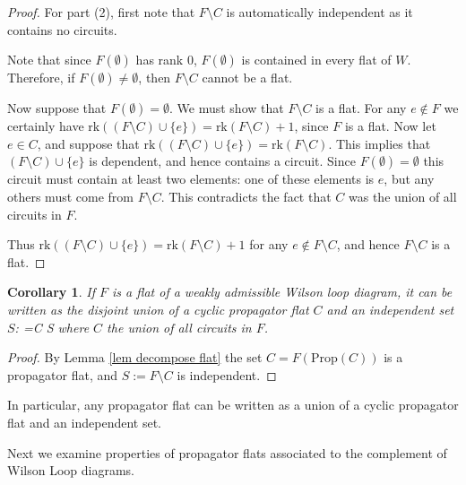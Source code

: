 \documentclass[11pt]{article}
\newcommand{\rk}{\textrm{rk} }
\def\bas #1\eas{\begin{align*} #1 \end{align*}}
\newcommand{\Prop}{\textrm{Prop}}
\newtheorem{cor}[thm]{Corollary}
\theoremstyle{remark}
\theoremstyle{definition}
\begin{document}
\begin{proof}
For part (2), first note that $F \setminus C$ is automatically independent as it contains no circuits.

Note that since $F(\emptyset)$ has rank $0$, $F(\emptyset)$ is contained in every flat of $W$. Therefore, if $F(\emptyset) \neq \emptyset$, then $F\setminus C$ cannot be a flat. 

Now suppose that $F(\emptyset) = \emptyset$. We must show that $F\setminus C$ is a flat. For any $e \not\in F$ we certainly have $\rk((F\setminus C)\cup\{e\}) = \rk(F\setminus C) +1$, since $F$ is a flat. Now let $e \in C$, and suppose that $\rk((F\setminus C)\cup\{e\}) = \rk(F\setminus C)$. This implies that $(F\setminus C)\cup \{e\}$ is dependent, and hence contains a circuit. Since $F(\emptyset) = \emptyset$ this circuit must contain at least two elements: one of these elements is $e$, but any others must come from $F \setminus C$. This contradicts the fact that $C$ was the union of all circuits in $F$. 

Thus $\rk((F\setminus C)\cup \{e\}) = \rk(F\setminus C) + 1$ for any $e \not\in F\setminus C$, and hence $F\setminus C$ is a flat.
\end{proof}

\begin{cor} \label{classifyflats}
  If $F$ is a flat of a weakly admissible Wilson loop diagram, it can be written as the disjoint union of a cyclic propagator flat $C$ and an independent set $S$: \bas F =C \sqcup S \eas where $C$ the union of all circuits in $F$. \end{cor}
 
\begin{proof}
By Lemma \ref{lem decompose flat} the set $C = F(\Prop(C))$ is a propagator flat, and $S := F \setminus C$ is independent.
\end{proof}

In particular, any propagator flat can be written as a union of a cyclic propagator flat and an independent set.

Next we examine properties of propagator flats associated to the complement of Wilson Loop diagrams.

\end{document}

